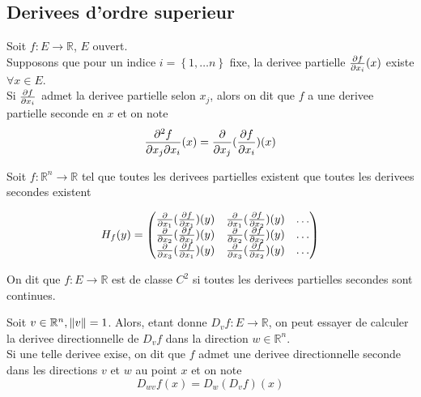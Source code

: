 \documentclass[../main.tex]{subfiles}
\begin{document}
\subsection{Derivees d'ordre superieur}
\begin{defn}
	Soit $f: E \to \mathbb{R}$, $E$ ouvert.\\
	Supposons que pour un indice $i = \left\{ 1, \ldots n \right\} $ fixe, la derivee partielle $\frac{\partial f}{\partial x_i}( x) $ existe $\forall x \in E$.\\
	Si $ \frac{\partial f}{\partial x_i}$ admet la derivee partielle selon $x_j$, alors on dit que $f$ a une derivee partielle seconde en $x$ et on note 
	\[ 
		\frac{\partial ^{2}f}{\partial x_j \partial x_i} ( x) = \frac{\partial }{\partial x_j} ( \frac{\partial f}{\partial x_i}) ( x) 
	\]
	
\end{defn}
\begin{defn}
	Soit $f: \mathbb{R}^n \to \mathbb{R}$ tel que toutes les derivees partielles existent que toutes les derivees secondes existent
	
	\begin{align*}
		H_f ( y) =
	\begin{pmatrix}
		\frac{\partial }{\partial x_1}( \frac{\partial f}{\partial x_1})( y)  &\frac{\partial }{\partial x_1}( \frac{\partial f}{\partial x_2})( y)  & \ldots\\
		\frac{\partial }{\partial x_2}( \frac{\partial f}{\partial x_1})( y) &\frac{\partial }{\partial x_2}( \frac{\partial f}{\partial x_2})( y) & \ldots\\
		\frac{\partial }{\partial x_3}( \frac{\partial f}{\partial x_1})( y) &\frac{\partial }{\partial x_3}( \frac{\partial f}{\partial x_2}) ( y)& \ldots\\
	\end{pmatrix}
	\end{align*}
	
\end{defn}
\begin{defn}[Espace $C^2( E) $]
	On dit que $f: E \to \mathbb{R}$ est de classe $C^{2}$ si toutes les derivees partielles secondes sont continues.
\end{defn}
\begin{defn}
Soit $v \in \mathbb{R}^n, \left\lVert v\right\rVert = 1$. Alors, etant donne $D_v f: E \to \mathbb{R}$, on peut essayer de calculer la derivee directionnelle de $D_v f$ dans la direction $w \in \mathbb{R}^n.$\\
Si une telle derivee exise, on dit que $f$ admet une derivee directionnelle seconde dans les directions $v$ et $w$ au point $x$ et on note
\[ 
	D_{wv} f( x) = D_w ( D_v f) ( x) 
\]

\end{defn}
\end{document}
